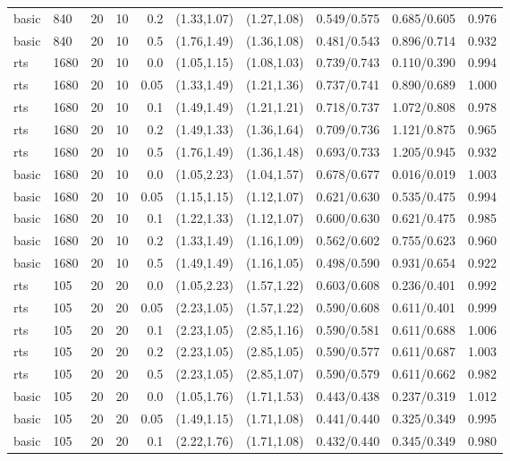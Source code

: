 \begin{tabular}{llrrrccccc}
basic & 840 & 20 & 10 & 0.2 & (1.33,1.07) & (1.27,1.08) & 0.549/0.575 & 0.685/0.605 & 0.976 \\
basic & 840 & 20 & 10 & 0.5 & (1.76,1.49) & (1.36,1.08) & 0.481/0.543 & 0.896/0.714 & 0.932 \\
rts & 1680 & 20 & 10 & 0.0 & (1.05,1.15) & (1.08,1.03) & 0.739/0.743 & 0.110/0.390 & 0.994 \\
rts & 1680 & 20 & 10 & 0.05 & (1.33,1.49) & (1.21,1.36) & 0.737/0.741 & 0.890/0.689 & 1.000 \\
rts & 1680 & 20 & 10 & 0.1 & (1.49,1.49) & (1.21,1.21) & 0.718/0.737 & 1.072/0.808 & 0.978 \\
rts & 1680 & 20 & 10 & 0.2 & (1.49,1.33) & (1.36,1.64) & 0.709/0.736 & 1.121/0.875 & 0.965 \\
rts & 1680 & 20 & 10 & 0.5 & (1.76,1.49) & (1.36,1.48) & 0.693/0.733 & 1.205/0.945 & 0.932 \\
basic & 1680 & 20 & 10 & 0.0 & (1.05,2.23) & (1.04,1.57) & 0.678/0.677 & 0.016/0.019 & 1.003 \\
basic & 1680 & 20 & 10 & 0.05 & (1.15,1.15) & (1.12,1.07) & 0.621/0.630 & 0.535/0.475 & 0.994 \\
basic & 1680 & 20 & 10 & 0.1 & (1.22,1.33) & (1.12,1.07) & 0.600/0.630 & 0.621/0.475 & 0.985 \\
basic & 1680 & 20 & 10 & 0.2 & (1.33,1.49) & (1.16,1.09) & 0.562/0.602 & 0.755/0.623 & 0.960 \\
basic & 1680 & 20 & 10 & 0.5 & (1.49,1.49) & (1.16,1.05) & 0.498/0.590 & 0.931/0.654 & 0.922 \\
rts & 105 & 20 & 20 & 0.0 & (1.05,2.23) & (1.57,1.22) & 0.603/0.608 & 0.236/0.401 & 0.992 \\
rts & 105 & 20 & 20 & 0.05 & (2.23,1.05) & (1.57,1.22) & 0.590/0.608 & 0.611/0.401 & 0.999 \\
rts & 105 & 20 & 20 & 0.1 & (2.23,1.05) & (2.85,1.16) & 0.590/0.581 & 0.611/0.688 & 1.006 \\
rts & 105 & 20 & 20 & 0.2 & (2.23,1.05) & (2.85,1.05) & 0.590/0.577 & 0.611/0.687 & 1.003 \\
rts & 105 & 20 & 20 & 0.5 & (2.23,1.05) & (2.85,1.07) & 0.590/0.579 & 0.611/0.662 & 0.982 \\
basic & 105 & 20 & 20 & 0.0 & (1.05,1.76) & (1.71,1.53) & 0.443/0.438 & 0.237/0.319 & 1.012 \\
basic & 105 & 20 & 20 & 0.05 & (1.49,1.15) & (1.71,1.08) & 0.441/0.440 & 0.325/0.349 & 0.995 \\
basic & 105 & 20 & 20 & 0.1 & (2.22,1.76) & (1.71,1.08) & 0.432/0.440 & 0.345/0.349 & 0.980 \\

\end{tabular}

